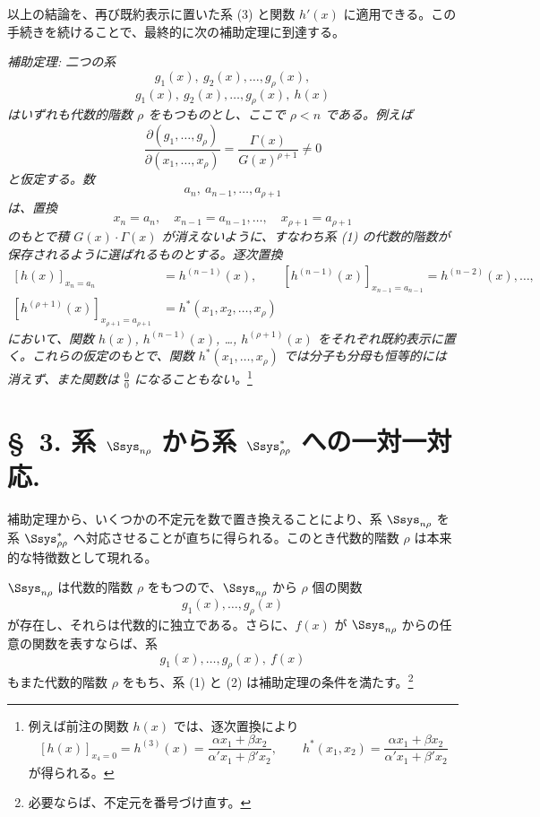 \documentclass[11pt]{article}
\begin{document}
以上の結論を、再び既約表示に置いた系 (3) と関数 $h'(x)$ に適用できる。この手続きを続けることで、最終的に次の補助定理に到達する。

\emph{補助定理: 二つの系}
\[
  g_1(x),\ g_2(x),\ldots,g_\rho(x),
\]
\[
  g_1(x),\ g_2(x),\ldots,g_\rho(x),\ h(x)
\]
\emph{はいずれも代数的階数 $\rho$ をもつものとし、ここで $\rho<n$ である。例えば}
\[
 \frac{\partial(g_1,\ldots,g_\rho)}{\partial(x_1,\ldots,x_\rho)}
 =\frac{\Gamma(x)}{G(x)^{\rho+1}}\ne0
\]
\emph{と仮定する。数}
\[
  a_n,\ a_{n-1},\ldots,a_{\rho+1}
\]
\emph{は、置換}
\[
  x_n=a_n,\quad x_{n-1}=a_{n-1},\ldots,\quad x_{\rho+1}=a_{\rho+1}
\]
\emph{のもとで積 $G(x)\cdot\Gamma(x)$ が消えないように、すなわち系 (1) の代数的階数が保存されるように選ばれるものとする。逐次置換}
\[
\begin{aligned}
 [h(x)]_{x_n=a_n}&=h^{(n-1)}(x),\qquad
 [h^{(n-1)}(x)]_{x_{n-1}=a_{n-1}}=h^{(n-2)}(x),\ldots,\\
 [h^{(\rho+1)}(x)]_{x_{\rho+1}=a_{\rho+1}}&=h^*(x_1,x_2,\ldots,x_\rho)
\end{aligned}
\]
\emph{において、関数 $h(x)$, $h^{(n-1)}(x)$, \ldots, $h^{(\rho+1)}(x)$ をそれぞれ既約表示に置く。これらの仮定のもとで、関数 $h^*(x_1,\ldots,x_\rho)$ では分子も分母も恒等的には消えず、また関数は $\frac{0}{0}$ になることもない。}\footnote{例えば前注の関数 $h(x)$ では、逐次置換により
\[
 [h(x)]_{x_4=0}=h^{(3)}(x)=\frac{\alpha x_1+\beta x_2}{\alpha' x_1+\beta' x_2},\qquad
 h^*(x_1,x_2)=\frac{\alpha x_1+\beta x_2}{\alpha' x_1+\beta' x_2}
\]
が得られる。}

\section*{\S\ 3. 系 $\Ssys_{n\rho}$ から系 $\Ssys^*_{\rho\rho}$ への一対一対応.}

補助定理から、いくつかの不定元を数で置き換えることにより、系 $\Ssys_{n\rho}$ を系 $\Ssys^*_{\rho\rho}$ へ対応させることが直ちに得られる。このとき代数的階数 $\rho$ は本来的な特徴数として現れる。

$\Ssys_{n\rho}$ は代数的階数 $\rho$ をもつので、$\Ssys_{n\rho}$ から $\rho$ 個の関数
\begin{equation}
  g_1(x),\ldots,g_\rho(x)
\tag{1}
\end{equation}
が存在し、それらは代数的に独立である。さらに、$f(x)$ が $\Ssys_{n\rho}$ からの任意の関数を表すならば、系
\begin{equation}
  g_1(x),\ldots,g_\rho(x),\ f(x)
\tag{2}
\end{equation}
もまた代数的階数 $\rho$ をもち、系 (1) と (2) は補助定理の条件を満たす。\footnote{必要ならば、不定元を番号づけ直す。}
\end{document}
